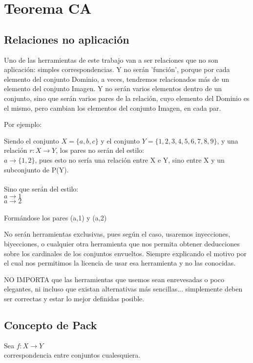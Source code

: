 \chapter{Teorema CA}

\newpage
\section{Relaciones no aplicación}
Uno de las herramientas de este trabajo van a ser relaciones que no son aplicación: simples correspondencias. Y no serán 'función', porque por cada elemento del conjunto Dominio, a veces, tendremos relacionados más de un elemento del conjunto Imagen. Y no serán varios elementos dentro de un conjunto, sino que serán varios pares de la relación, cuyo elemento del Dominio es el mismo, pero cambian los elementos del conjunto Imagen, en cada par.

Por ejemplo:

\noindent Siendo el conjunto $X=\{a,b,c\}$ y el conjunto $Y=\{1,2,3,4,5,6,7,8,9\}$, y una relación $r:X \rightarrow Y$, los pares no serán del estilo:\\
$a \rightarrow \{1,2\}$, pues esto no sería una relación entre X e Y, sino entre X y un subconjunto de P(Y).\\\\
\noindent Sino que serán del estilo:\\
$a \rightarrow 1$\\
$a \rightarrow 2$\\\\
\noindent Formándose los pares (a,1) y (a,2)

No serán herramientas exclusivas, pues según el caso, usaremos inyecciones, biyecciones, o cualquier otra herramienta que nos permita obtener deducciones sobre los cardinales de los conjuntos envueltos. Siempre explicando el motivo por el cual nos permitimos la licencia de usar esa herramienta y no las conocidas. 

NO IMPORTA que las herramientas que usemos sean enrevesadas o poco elegantes, ni incluso que existan alternativas más sencillas... simplemente deben ser correctas y estar lo mejor definidas posible.

\newpage
\section{Concepto de Pack}
\noindent
Sea $f:X \rightarrow Y$\\ 
correspondencia entre conjuntos cualesquiera.\\

